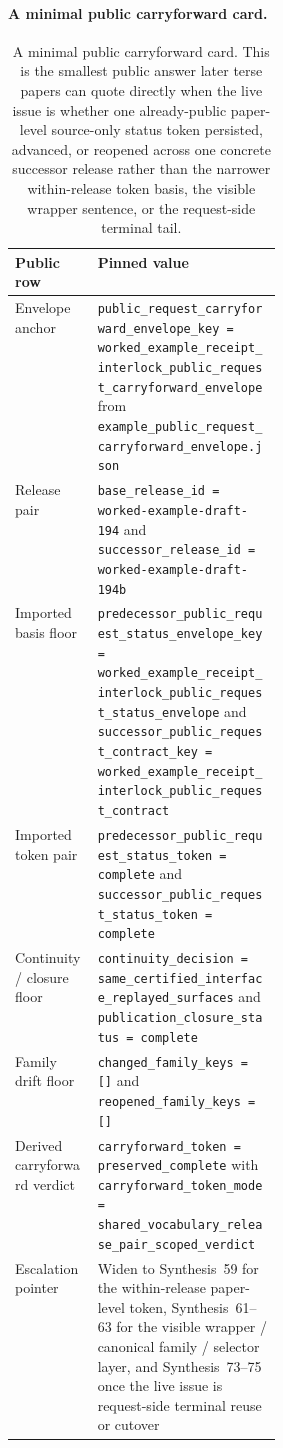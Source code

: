 \documentclass[11pt]{article}
\begin{document}
\paragraph{A minimal public carryforward card.}
\begin{table}[t]
\centering
\small
\begin{tabularx}{0.97\linewidth}{@{}p{0.31\linewidth}X@{}}
\toprule
\textbf{Public row} & \textbf{Pinned value}\\
\midrule
Envelope anchor & \texttt{public\_request\_carryforward\_envelope\_key = worked\_example\_receipt\_interlock\_public\_request\_carryforward\_envelope} from \nolinkurl{example_public_request_carryforward_envelope.json} \\
Release pair & \texttt{base\_release\_id = worked-example-draft-194} and \texttt{successor\_release\_id = worked-example-draft-194b} \\
Imported basis floor & \texttt{predecessor\_public\_request\_status\_envelope\_key = worked\_example\_receipt\_interlock\_public\_request\_status\_envelope} and \texttt{successor\_public\_request\_contract\_key = worked\_example\_receipt\_interlock\_public\_request\_contract} \\
Imported token pair & \texttt{predecessor\_public\_request\_status\_token = complete} and \texttt{successor\_public\_request\_status\_token = complete} \\
Continuity / closure floor & \texttt{continuity\_decision = same\_certified\_interface\_replayed\_surfaces} and \texttt{publication\_closure\_status = complete} \\
Family drift floor & \texttt{changed\_family\_keys = []} and \texttt{reopened\_family\_keys = []} \\
Derived carryforward verdict & \texttt{carryforward\_token = preserved\_complete} with \texttt{carryforward\_token\_mode = shared\_vocabulary\_release\_pair\_scoped\_verdict} \\
Escalation pointer & Widen to Synthesis~59 for the within-release paper-level token, Synthesis~61--63 for the visible wrapper / canonical family / selector layer, and Synthesis~73--75 once the live issue is request-side terminal reuse or cutover \\
\bottomrule
\end{tabularx}
\caption{A minimal public carryforward card. This is the smallest public answer later terse papers can quote directly when the live issue is whether one already-public paper-level source-only status token persisted, advanced, or reopened across one concrete successor release rather than the narrower within-release token basis, the visible wrapper sentence, or the request-side terminal tail.}
\label{tab:minimal-public-request-carryforward-card}
\end{table}
\end{document}
